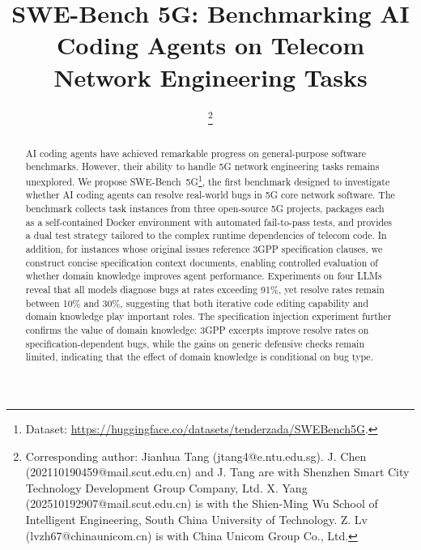 \documentclass[10pt,conference]{IEEEtran}
\begin{document}
\title{SWE-Bench 5G: Benchmarking AI Coding Agents on Telecom Network Engineering Tasks}

\author{
\thanks{Corresponding author: Jianhua Tang (jtang4@e.ntu.edu.sg). J. Chen (202110190459@mail.scut.edu.cn) and J. Tang are with Shenzhen Smart City Technology Development Group Company, Ltd. X. Yang (202510192907@mail.scut.edu.cn) is with the Shien-Ming Wu School of Intelligent Engineering, South China University of Technology.
Z. Lv (lvzh67@chinaunicom.cn) is with China Unicom Group Co., Ltd.}
}

\maketitle

\begin{abstract}
AI coding agents have achieved remarkable progress on general-purpose software benchmarks. However, their ability to handle 5G network engineering tasks remains unexplored. We propose SWE-Bench~5G\footnote{Dataset: \url{https://huggingface.co/datasets/tenderzada/SWEBench5G}.}, the first benchmark designed to investigate whether AI coding agents can resolve real-world bugs in 5G core network software. The benchmark collects task instances from three open-source 5G projects, packages each as a self-contained Docker environment with automated fail-to-pass tests, and provides a dual test strategy tailored to the complex runtime dependencies of telecom code. In addition, for instances whose original issues reference 3GPP specification clauses, we construct concise specification context documents, enabling controlled evaluation of whether domain knowledge improves agent performance. Experiments on four LLMs reveal that all models diagnose bugs at rates exceeding 91\%, yet resolve rates remain between 10\% and 30\%, suggesting that both iterative code editing capability and domain knowledge play important roles. The specification injection experiment further confirms the value of domain knowledge: 3GPP excerpts improve resolve rates on specification-dependent bugs, while the gains on generic defensive checks remain limited, indicating that the effect of domain knowledge is conditional on bug type.
\end{abstract}
\end{document}
